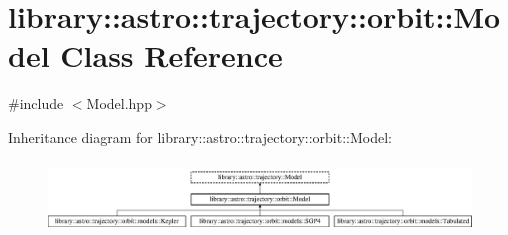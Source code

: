 \hypertarget{classlibrary_1_1astro_1_1trajectory_1_1orbit_1_1_model}{}\section{library\+:\+:astro\+:\+:trajectory\+:\+:orbit\+:\+:Model Class Reference}
\label{classlibrary_1_1astro_1_1trajectory_1_1orbit_1_1_model}


{\ttfamily \#include $<$Model.\+hpp$>$}

Inheritance diagram for library\+:\+:astro\+:\+:trajectory\+:\+:orbit\+:\+:Model\+:\begin{figure}[H]
\begin{center}
\leavevmode
\includegraphics[height=1.944444cm]{classlibrary_1_1astro_1_1trajectory_1_1orbit_1_1_model}
\end{center}
\end{figure}
